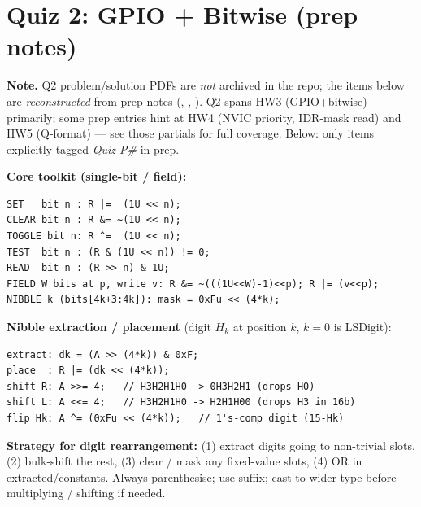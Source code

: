 \section{Quiz 2: GPIO + Bitwise (prep notes)}

\textbf{Note.} Q2 problem/solution PDFs are \emph{not} archived in the repo; the items below are \emph{reconstructed} from prep notes (, , ). Q2 spans HW3 (GPIO+bitwise) primarily; some prep entries hint at HW4 (NVIC priority, IDR-mask read) and HW5 (Q-format) — see those partials for full coverage. Below: only items explicitly tagged \emph{Quiz P\#} in prep.

\textbf{Core toolkit (single-bit / field):}
\begin{lstlisting}[language={}]
SET   bit n : R |=  (1U << n);
CLEAR bit n : R &= ~(1U << n);
TOGGLE bit n: R ^=  (1U << n);
TEST  bit n : (R & (1U << n)) != 0;
READ  bit n : (R >> n) & 1U;
FIELD W bits at p, write v: R &= ~(((1U<<W)-1)<<p); R |= (v<<p);
NIBBLE k (bits[4k+3:4k]): mask = 0xFu << (4*k);
\end{lstlisting}

\textbf{Nibble extraction / placement} (digit $H_k$ at position $k$, $k=0$ is LSDigit):
\begin{lstlisting}[language={}]
extract: dk = (A >> (4*k)) & 0xF;
place  : R |= (dk << (4*k));
shift R: A >>= 4;   // H3H2H1H0 -> 0H3H2H1 (drops H0)
shift L: A <<= 4;   // H3H2H1H0 -> H2H1H00 (drops H3 in 16b)
flip Hk: A ^= (0xFu << (4*k));   // 1's-comp digit (15-Hk)
\end{lstlisting}

\textbf{Strategy for digit rearrangement:} (1) extract digits going to non-trivial slots, (2) bulk-shift the rest, (3) clear / mask any fixed-value slots, (4) OR in extracted/constants. Always parenthesise; use  suffix; cast to wider type before multiplying / shifting if needed.

